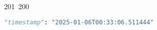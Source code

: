 201~200~\documentclass{article}
\begin{document}
\begin{lstlisting}[language=Python, caption=Downloaded client messages ( Unlocked and Locked ) ]
	                                                                                                                                                                                                                                                                                                	                                                                                                                                        	    	                                                                                                	                                                                                        "timestamp": "2025-01-06T00:33:06.511444"
	                                                                                                                                                                                                                                                                                                	                                                                                                                                        	    	                                                                                                	                                                                                            }
	                                                                                                                                                                                                                                                                                                	                                                                                                                                        	    	                                                                                                	                                                                                            ]
	                                                                                                                                                                                                                                                                                                	                                                                                                                                        	    	                                                                                                	                                                                                            \end{lstlisting}
\end{document}
